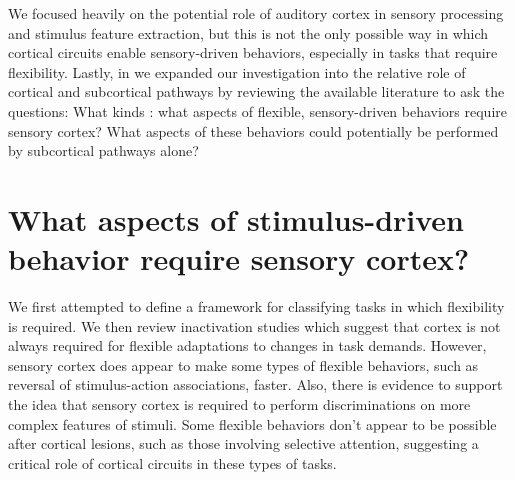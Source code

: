 We focused heavily on the potential role of auditory cortex in sensory processing and stimulus feature extraction, but this is not the only possible way in which cortical circuits enable sensory-driven behaviors, especially in tasks that require flexibility. 
%
Lastly, in \ch{\Rev} we expanded our investigation into the relative role of cortical and subcortical pathways by reviewing the available literature to ask the questions: What kinds : what aspects of flexible, sensory-driven behaviors require sensory cortex? 
%
What aspects of these behaviors could potentially be performed by subcortical pathways alone?

\section{What aspects of stimulus-driven behavior require sensory cortex?}

We first attempted to define a framework for classifying tasks in which flexibility is required. 
%
We then review inactivation studies which suggest that cortex is not always required for flexible adaptations to changes in task demands. 
%
However, sensory cortex does appear to make some types of flexible behaviors, such as reversal of stimulus-action associations, faster. 
%
Also, there is evidence to support the idea that sensory cortex is required to perform discriminations on more complex features of stimuli. 
%
Some flexible behaviors don't appear to be possible after cortical lesions, such as those involving selective attention, suggesting a critical role of cortical circuits in these types of tasks. 


